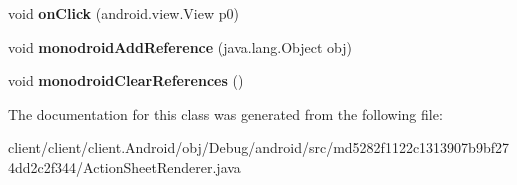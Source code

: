 \begin{DoxyCompactItemize}
\item 
\hypertarget{classmd5282f1122c1313907b9bf274dd2c2f344_1_1ActionSheetRenderer_a7c15d4490d59869b538db0c6d634fc3e}{}void {\bfseries on\+Click} (android.\+view.\+View p0)\label{classmd5282f1122c1313907b9bf274dd2c2f344_1_1ActionSheetRenderer_a7c15d4490d59869b538db0c6d634fc3e}

\item 
\hypertarget{classmd5282f1122c1313907b9bf274dd2c2f344_1_1ActionSheetRenderer_aaf6031e2fb048e910faf2e6043afca22}{}void {\bfseries monodroid\+Add\+Reference} (java.\+lang.\+Object obj)\label{classmd5282f1122c1313907b9bf274dd2c2f344_1_1ActionSheetRenderer_aaf6031e2fb048e910faf2e6043afca22}

\item 
\hypertarget{classmd5282f1122c1313907b9bf274dd2c2f344_1_1ActionSheetRenderer_a1ce338aa93034ee838cf84d6d9e50986}{}void {\bfseries monodroid\+Clear\+References} ()\label{classmd5282f1122c1313907b9bf274dd2c2f344_1_1ActionSheetRenderer_a1ce338aa93034ee838cf84d6d9e50986}

\end{DoxyCompactItemize}


The documentation for this class was generated from the following file\+:\begin{DoxyCompactItemize}
\item 
client/client/client.\+Android/obj/\+Debug/android/src/md5282f1122c1313907b9bf274dd2c2f344/Action\+Sheet\+Renderer.\+java\end{DoxyCompactItemize}
